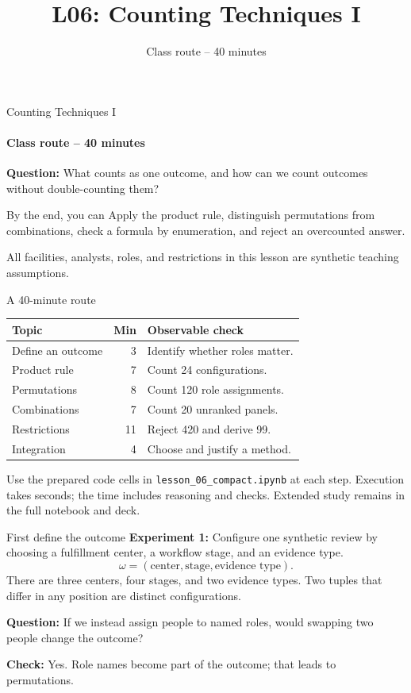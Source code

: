 \documentclass[aspectratio=169,10pt,english]{beamer}
\title{L06: Counting Techniques I}
\subtitle{Class route -- 40 minutes}
\author{}
\date{}
\begin{document}
\begin{frame}{Counting Techniques I}
\framesubtitle{Class route -- 40 minutes}
\textbf{Question:} What counts as one outcome, and how can we count outcomes without double-counting them?
\begin{block}{By the end, you can}
Apply the product rule, distinguish permutations from combinations, check a formula by enumeration, and reject an overcounted answer.
\end{block}
\smallskip
All facilities, analysts, roles, and restrictions in this lesson are synthetic teaching assumptions.
\end{frame}

\begin{frame}{A 40-minute route}
\small
\begin{tabular}{p{.42\linewidth}rp{.39\linewidth}}
\toprule Topic & Min & Observable check \\ \midrule
Define an outcome & 3 & Identify whether roles matter.\\
Product rule & 7 & Count 24 configurations.\\
Permutations & 8 & Count 120 role assignments.\\
Combinations & 7 & Count 20 unranked panels.\\
Restrictions & 11 & Reject 420 and derive 99.\\
Integration & 4 & Choose and justify a method.\\ \bottomrule
\end{tabular}
\par\medskip
Use the prepared code cells in \texttt{lesson\_06\_compact.ipynb} at each step. Execution takes seconds; the time includes reasoning and checks. Extended study remains in the full notebook and deck.
\end{frame}

\begin{frame}{First define the outcome}
\textbf{Experiment 1:} Configure one synthetic review by choosing a fulfillment center, a workflow stage, and an evidence type.
\[
\omega=(\text{center},\text{stage},\text{evidence type}).
\]
There are three centers, four stages, and two evidence types. Two tuples that differ in any position are distinct configurations.
\par\medskip
\textbf{Question:} If we instead assign people to named roles, would swapping two people change the outcome?
\par\smallskip
\textbf{Check:} Yes. Role names become part of the outcome; that leads to permutations.
\end{frame}
\end{document}
